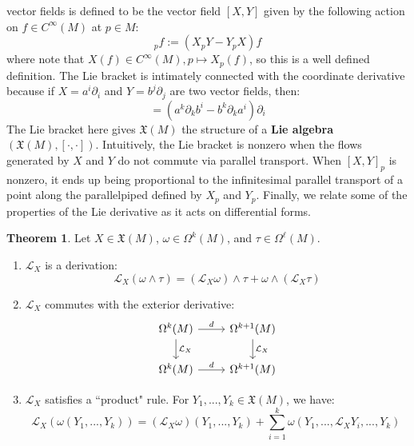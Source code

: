 \documentclass[11pt, oneside]{article}   	%
\theoremstyle{definition}
\newtheorem{theorem}{Theorem}[section]
\begin{document}
vector fields is defined to be the vector field $[X, Y]$ given by the following action on $f\in C^\infty(M)$ at $p\in M$:
\begin{equation}
	[X, Y]_p f := (X_p Y - Y_p X) f
\end{equation}
where note that $X(f)\in C^\infty(M), p\mapsto X_p(f)$, so this is a well defined definition. The Lie bracket is 
intimately connected with the coordinate derivative because if $X = a^i\partial_i$ and $Y = b^j\partial_j$ are two vector 
fields, then:
\begin{equation}
	[X, Y] = \left(a^k\partial_k b^i - b^k\partial_k a^i\right)\partial_i
\end{equation}
The Lie bracket here gives $\mathfrak X(M)$ the structure of a \textbf{Lie algebra} $\left(\mathfrak X(M), [\cdot, \cdot]\right)$. 
Intuitively, the Lie bracket is nonzero when the flows generated by $X$ and $Y$ do not commute via parallel transport. When 
$[X, Y]_p$ is nonzero, it ends up being proportional to the infinitesimal parallel transport of a point along the parallelpiped 
defined by $X_p$ and $Y_p$. Finally, we relate some of the properties of the Lie derivative as it acts on differential forms. 

\begin{theorem}
	Let $X\in\mathfrak X(M)$, $\omega\in\Omega^k(M)$, and $\tau\in\Omega^\ell(M)$. 
	\begin{enumerate}
		\item $\mathcal L_X$ is a derivation:
		\begin{equation}
			\mathcal L_X(\omega\wedge\tau) = (\mathcal L_X\omega)\wedge\tau + \omega\wedge(\mathcal L_X\tau)
		\end{equation}
		
		\item $\mathcal L_X$ commutes with the exterior derivative:
		\begin{equation}\begin{tikzcd}
			\Omega^k(M)\arrow[d, "\mathcal L_X"]\arrow[r, "d"] & \Omega^{k + 1}(M)\arrow[d, "\mathcal L_X"] \\
			\Omega^k(M)\arrow[r, "d"] & \Omega^{k + 1}(M)
		\end{tikzcd}\end{equation}
		
		\item $\mathcal L_X$ satisfies a ``product" rule. For $Y_1, ..., Y_k\in\mathfrak X(M)$, we have:
		\begin{equation}
			\mathcal L_X(\omega(Y_1, ..., Y_k)) = (\mathcal L_X\omega)(Y_1, ..., Y_k) + \sum_{i = 1}^k\omega(Y_1, ..., 
			\mathcal L_X Y_i, ..., Y_k)~
			\label{eq:lie_derivative_global}
		\end{equation}
	\end{enumerate}
\end{theorem}
\end{document}
